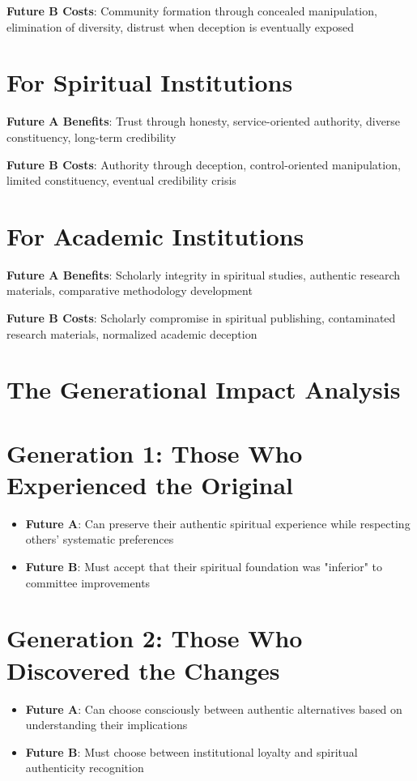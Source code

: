 \documentclass[11pt,twoside]{book}
\begin{document}
\textbf{\textbf{Future B Costs}}: Community formation through concealed manipulation, elimination of diversity, distrust when deception is eventually exposed
\section*{For Spiritual Institutions}
\label{sec:org5ce8e5c}
\textbf{\textbf{Future A Benefits}}: Trust through honesty, service-oriented authority, diverse constituency, long-term credibility

\textbf{\textbf{Future B Costs}}: Authority through deception, control-oriented manipulation, limited constituency, eventual credibility crisis
\section*{For Academic Institutions}
\label{sec:org295344f}
\textbf{\textbf{Future A Benefits}}: Scholarly integrity in spiritual studies, authentic research materials, comparative methodology development

\textbf{\textbf{Future B Costs}}: Scholarly compromise in spiritual publishing, contaminated research materials, normalized academic deception
\section*{The Generational Impact Analysis}
\label{sec:org5b2cbf1}

\section*{Generation 1: Those Who Experienced the Original}
\label{sec:orgc1db251}
\begin{itemize}
\item \textbf{\textbf{Future A}}: Can preserve their authentic spiritual experience while respecting others' systematic preferences
\item \textbf{\textbf{Future B}}: Must accept that their spiritual foundation was "inferior" to committee improvements
\end{itemize}
\section*{Generation 2: Those Who Discovered the Changes}
\label{sec:orga90ffa4}
\begin{itemize}
\item \textbf{\textbf{Future A}}: Can choose consciously between authentic alternatives based on understanding their implications
\item \textbf{\textbf{Future B}}: Must choose between institutional loyalty and spiritual authenticity recognition
\end{itemize}
\end{document}
